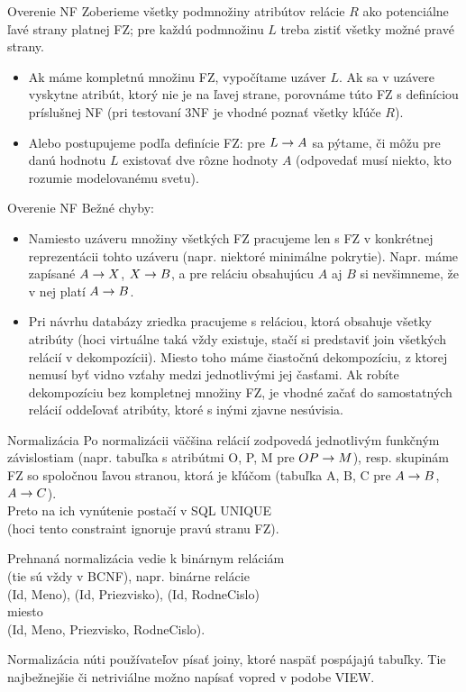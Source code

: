 \documentclass[12pt]{beamer}
\begin{document}
\begin{frame}[fragile]{Overenie NF}
Zoberieme všetky podmnožiny atribútov relácie $R$ ako potenciálne ľavé strany platnej FZ;
pre každú podmnožinu $L$ treba zistiť všetky možné pravé strany.
\begin{itemize}
\item Ak máme kompletnú množinu FZ, vypočítame uzáver $L$.
Ak sa v uzávere vyskytne atribút, ktorý nie je na ľavej strane, porovnáme túto FZ s definíciou príslušnej NF
(pri testovaní 3NF je vhodné poznať všetky kľúče $R$).

\item Alebo postupujeme podľa definície FZ: pre $L\rightarrow A$ sa pýtame,
či môžu pre danú hodnotu $L$ existovať dve rôzne hodnoty $A$
(odpovedať musí niekto, kto rozumie modelovanému svetu).
\end{itemize}
\end{frame}

\begin{frame}[fragile]{Overenie NF}
Bežné chyby:
\begin{itemize}
\item Namiesto uzáveru množiny všetkých FZ pracujeme len s FZ v konkrétnej reprezentácii tohto uzáveru (napr. niektoré minimálne pokrytie).
Napr. máme zapísané $A\rightarrow X$, $X\rightarrow B$, a pre reláciu obsahujúcu $A$ aj $B$ si nevšimneme, že v nej platí $A\rightarrow B$.
\item Pri návrhu databázy zriedka pracujeme s reláciou, ktorá obsahuje všetky atribúty
(hoci virtuálne taká vždy existuje, stačí si predstaviť join všetkých relácií v dekompozícii).
Miesto toho máme čiastočnú dekompozíciu, z ktorej nemusí byť vidno vzťahy medzi jednotlivými jej časťami.
Ak robíte dekompozíciu bez kompletnej množiny FZ, je vhodné začať do samostatných relácií oddeľovať atribúty, ktoré s inými zjavne nesúvisia.
\end{itemize}
\end{frame}

\begin{frame}[fragile]{Normalizácia}
Po normalizácii väčšina relácií zodpovedá jednotlivým funkčným závislostiam (napr. tabuľka s atribútmi O, P, M pre $OP\rightarrow M$),
resp. skupinám FZ so spoločnou ľavou stranou, ktorá je kľúčom (tabuľka A, B, C pre $A\rightarrow B$, $A\rightarrow C$).\\
Preto na ich vynútenie postačí v SQL UNIQUE\\
(hoci tento constraint ignoruje pravú stranu FZ).
\bigskip

Prehnaná normalizácia vedie k binárnym reláciám\\
(tie sú vždy v BCNF), napr. binárne relácie\\
(Id, Meno), (Id, Priezvisko), (Id, RodneCislo)\\
miesto\\
(Id, Meno, Priezvisko, RodneCislo).
\bigskip

Normalizácia núti používateľov písať joiny, ktoré naspäť pospájajú tabuľky.
Tie najbežnejšie či netriviálne možno napísať vopred v podobe VIEW.
\end{frame}
\end{document}
